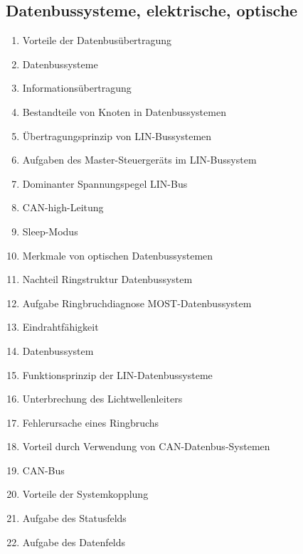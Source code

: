\subsection{Datenbussysteme, elektrische,
optische}\label{datenbussysteme-elektrische-optische}

\begin{enumerate}
\item
  Vorteile der Datenbusübertragung\\
\item
  Datenbussysteme\\
\item
  Informationsübertragung\\
\item
  Bestandteile von Knoten in Datenbussystemen\\
\item
  Übertragungsprinzip von LIN-Bussystemen\\
\item
  Aufgaben des Master-Steuergeräts im LIN-Bussystem\\
\item
  Dominanter Spannungspegel LIN-Bus\\
\item
  CAN-high-Leitung\\
\item
  Sleep-Modus\\
\item
  Merkmale von optischen Datenbussystemen\\
\item
  Nachteil Ringstruktur Datenbussystem\\
\item
  Aufgabe Ringbruchdiagnose MOST-Datenbussystem\\
\item
  Eindrahtfähigkeit\\
\item
  Datenbussystem\\
\item
  Funktionsprinzip der LIN-Datenbussysteme\\
\item
  Unterbrechung des Lichtwellenleiters\\
\item
  Fehlerursache eines Ringbruchs\\
\item
  Vorteil durch Verwendung von CAN-Datenbus-Systemen\\
\item
  CAN-Bus\\
\item
  Vorteile der Systemkopplung\\
\item
  Aufgabe des Statusfelds\\
\item
  Aufgabe des Datenfelds
\end{enumerate}

